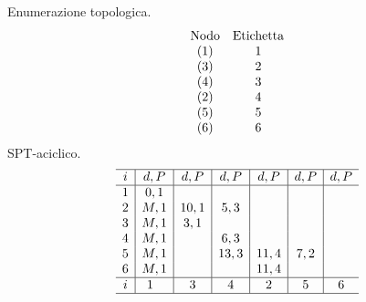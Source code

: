 Enumerazione topologica.
\begin{equation*}
\begin{array}{ c c }
\text{Nodo} & \text{Etichetta}\\
( 1) & 1\\
( 3) & 2\\
( 4) & 3\\
( 2) & 4\\
( 5) & 5\\
( 6) & 6
\end{array}
\end{equation*}
SPT-aciclico.
\begin{equation*}
\begin{array}{ c|c|c|c|c|c|c }
\hline
i & d,P & d,P & d,P & d,P & d,P & d,P\\
\hline
1 & 0,1 &  &  &  &  & \\
2 & M,1 & 10,1 & 5,3 &  &  & \\
3 & M,1 & 3,1 &  &  &  & \\
4 & M,1 &  & 6,3 &  &  & \\
5 & M,1 &  & 13,3 & 11,4 & 7,2 & \\
6 & M,1 &  &  & 11,4 &  & \\
\hline
i & 1\ \  & 3 & 4 & 2 & 5 & 6\\
\hline
\end{array}
\end{equation*}


\Es

